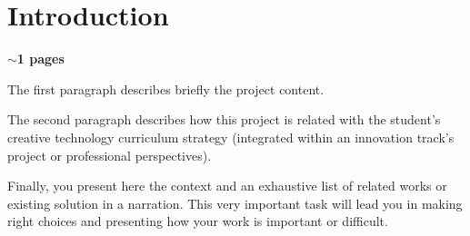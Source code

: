 
\section*{Introduction }
\textbf{$\sim$1 pages}

The first paragraph describes briefly the project content. 

The second paragraph describes how this project is related with the student's creative technology curriculum strategy (integrated within an innovation track's project or professional perspectives).

Finally, you present here the context and an exhaustive list of related works or existing solution in a narration. This very important task will lead you in making right choices and presenting how your work is important or difficult. 


\pagebreak
